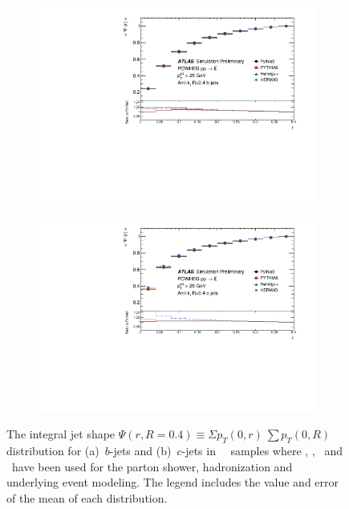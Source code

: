 \begin{figure}
\centering
\begin{subfigure}[]{0.45\textwidth}
\includegraphics[width=\textwidth]{evtgen/figures/Frag/Top/SingleB/PsiVariableR.pdf}
\end{subfigure}
\begin{subfigure}[]{0.45\textwidth}
\includegraphics[width=\textwidth]{evtgen/figures/Frag/Top/SingleC/PsiVariableR.pdf}
\end{subfigure}
\caption{The integral jet shape 
$\Psi \left( r, R=0.4 \right ) \equiv  \Sigma p_T \left(0, r \right) \ \sum p_T \left(0, R \right) $ 
distribution for 
(a)~$b$-jets and (b)~$c$-jets in \PowHeg\
\ttbar\ samples where  \PythiaE, \Pythia, \Herwigpp\ and \Herwig\ have been used 
for the parton shower, hadronization and underlying event modeling. The legend includes the value and error of the mean of each distribution.}
\label{fig:tpsi}
\end{figure}



